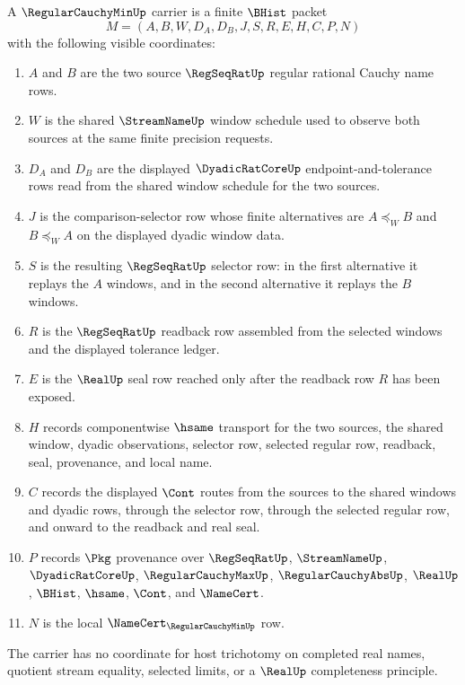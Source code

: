 \begin{definition}
\label{def:regular-cauchy-min-carrier}
A $\RegularCauchyMinUp$ carrier is a finite $\BHist$ packet
$$
M=(A,B,W,D_A,D_B,J,S,R,E,H,C,P,N)
$$
with the following visible coordinates:
\begin{enumerate}
\item $A$ and $B$ are the two source $\RegSeqRatUp$ regular rational Cauchy name rows.
\item $W$ is the shared $\StreamNameUp$ window schedule used to observe both sources at the same finite precision requests.
\item $D_A$ and $D_B$ are the displayed $\DyadicRatCoreUp$ endpoint-and-tolerance rows read from the shared window schedule for the two sources.
\item $J$ is the comparison-selector row whose finite alternatives are $A \preceq_W B$ and $B \preceq_W A$ on the displayed dyadic window data.
\item $S$ is the resulting $\RegSeqRatUp$ selector row: in the first alternative it replays the $A$ windows, and in the second alternative it replays the $B$ windows.
\item $R$ is the $\RegSeqRatUp$ readback row assembled from the selected windows and the displayed tolerance ledger.
\item $E$ is the $\RealUp$ seal row reached only after the readback row $R$ has been exposed.
\item $H$ records componentwise $\hsame$ transport for the two sources, the shared window, dyadic observations, selector row, selected regular row, readback, seal, provenance, and local name.
\item $C$ records the displayed $\Cont$ routes from the sources to the shared windows and dyadic rows, through the selector row, through the selected regular row, and onward to the readback and real seal.
\item $P$ records $\Pkg$ provenance over $\RegSeqRatUp$, $\StreamNameUp$, $\DyadicRatCoreUp$, $\RegularCauchyMaxUp$, $\RegularCauchyAbsUp$, $\RealUp$, $\BHist$, $\hsame$, $\Cont$, and $\NameCert$.
\item $N$ is the local $\NameCert_{\RegularCauchyMinUp}$ row.
\end{enumerate}
The carrier has no coordinate for host trichotomy on completed real names, quotient stream equality, selected limits, or a $\RealUp$ completeness principle.
\end{definition}

